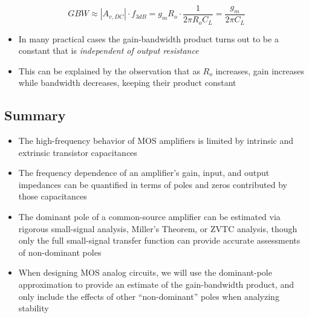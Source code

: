 \documentclass[11pt]{article}
\providecommand{\tightlist}{%
      \setlength{\itemsep}{0pt}\setlength{\parskip}{0pt}}
\begin{document}
\begin{equation}
GBW \approx |A_{v,DC}|\cdot f_{3dB} = g_m R_o \cdot \dfrac{1}{2 \pi R_o C_L} = \dfrac{g_m}{2\pi C_L}
\end{equation}

\begin{itemize}
\tightlist
\item
  In many practical cases the gain-bandwidth product turns out to be a
  constant that is \emph{independent of output resistance}
\item
  This can be explained by the observation that as \(R_o\) increases,
  gain increases while bandwidth decreases, keeping their product
  constant
\end{itemize}

    \hypertarget{summary}{%
\subsection{Summary}\label{summary}}

    \begin{itemize}
\tightlist
\item
  The high-frequency behavior of MOS amplifiers is limited by intrinsic
  and extrinsic transistor capacitances
\item
  The frequency dependence of an amplifier's gain, input, and output
  impedances can be quantified in terms of poles and zeros contributed
  by those capacitances
\item
  The dominant pole of a common-source amplifier can be estimated via
  rigorous small-signal analysis, Miller's Theorem, or ZVTC analysis,
  though only the full small-signal transfer function can provide
  accurate assessments of non-dominant poles
\item
  When designing MOS analog circuits, we will use the dominant-pole
  approximation to provide an estimate of the gain-bandwidth product,
  and only include the effects of other ``non-dominant'' poles when
  analyzing stability
\end{itemize}


    
    
    
\end{document}

